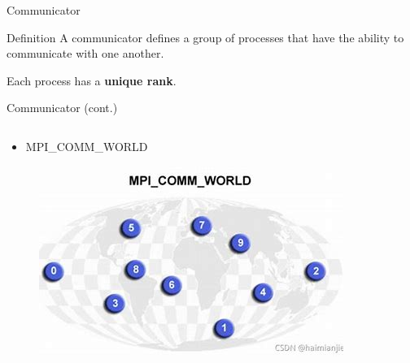 \begin{frame}{Communicator}
    \begin{block}{Definition}
        A communicator defines a group of processes that have the ability to communicate with one another.
        
        Each process has a \alert{\textbf{unique rank}}.
    \end{block}
\end{frame}


\begin{frame}{Communicator (cont.)}
\begin{columns}
    \begin{column}{.6\textwidth}
        \begin{itemize}
        \item MPI\_COMM\_WORLD
        \end{itemize}
        \begin{figure}
            \centering
            \includegraphics[width=\linewidth]{day8_am/img/mpi/mpi_comm_world.png}
            \caption{}
            \label{fig:mpi_comm_world}
        \end{figure}
    \end{column}
\end{columns}

\end{frame}


